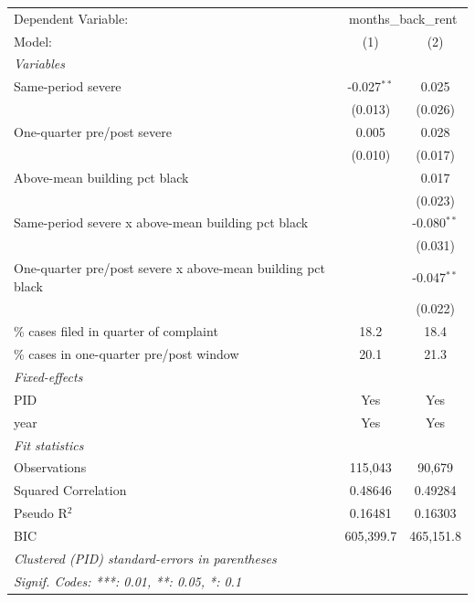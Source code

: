 \begingroup
\centering
\begin{tabular}{lcc}
   \tabularnewline \midrule \midrule
   Dependent Variable: & \multicolumn{2}{c}{months\_back\_rent}\\
   Model:                                                      & (1)           & (2)\\  
   \midrule
   \emph{Variables}\\
   Same-period severe                                          & -0.027$^{**}$ & 0.025\\   
                                                               & (0.013)       & (0.026)\\   
   One-quarter pre/post severe                                 & 0.005         & 0.028\\   
                                                               & (0.010)       & (0.017)\\   
   Above-mean building pct black                               &               & 0.017\\   
                                                               &               & (0.023)\\   
   Same-period severe x above-mean building pct black          &               & -0.080$^{**}$\\   
                                                               &               & (0.031)\\   
   One-quarter pre/post severe x above-mean building pct black &               & -0.047$^{**}$\\   
                                                               &               & (0.022)\\   
   \% cases filed in quarter of complaint                      & 18.2          & 18.4\\  
   \% cases in one-quarter pre/post window                     & 20.1          & 21.3\\  
   \midrule
   \emph{Fixed-effects}\\
   PID                                                         & Yes           & Yes\\  
   year                                                        & Yes           & Yes\\  
   \midrule
   \emph{Fit statistics}\\
   Observations                                                & 115,043       & 90,679\\  
   Squared Correlation                                         & 0.48646       & 0.49284\\  
   Pseudo R$^2$                                                & 0.16481       & 0.16303\\  
   BIC                                                         & 605,399.7     & 465,151.8\\  
   \midrule \midrule
   \multicolumn{3}{l}{\emph{Clustered (PID) standard-errors in parentheses}}\\
   \multicolumn{3}{l}{\emph{Signif. Codes: ***: 0.01, **: 0.05, *: 0.1}}\\
\end{tabular}
\par\endgroup
